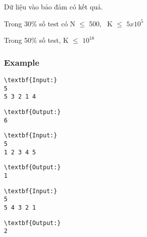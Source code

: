 Dữ liệu vào bảo đảm có kết quả.


Trong 30\% số test có N  $\le$  500,  K  $\le$  $5x10^{5}$


Trong 50\% số test, K  $\le$  $10^{18}$

\subsubsection{Example}
\begin{verbatim}
\textbf{Input:}
5
5 3 2 1 4\end{verbatim}
\begin{verbatim}
\textbf{Output:}
6\end{verbatim}
\begin{verbatim}
\textbf{Input:}
5
1 2 3 4 5\end{verbatim}
\begin{verbatim}
\textbf{Output:}
1\end{verbatim}
\begin{verbatim}
\textbf{Input:}
5
5 4 3 2 1\end{verbatim}
\begin{verbatim}
\textbf{Output:}
2\end{verbatim}

